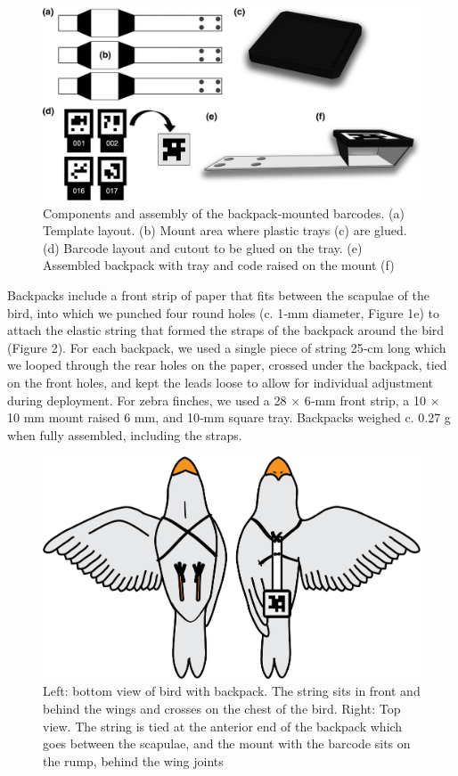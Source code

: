 \documentclass[11pt,a4paper,oneside]{article}
\begin{document}
\begin{figure}
    \centering
    \includegraphics{Graving_IMPRS_Thesis/figures/bird_figure_1.jpg}
    \caption{Components and assembly of the backpack‐mounted barcodes. (a) Template layout. (b) Mount area where plastic trays (c) are glued. (d) Barcode layout and cutout to be glued on the tray. (e) Assembled backpack with tray and code raised on the mount (f)}
    \label{fig:bird_figure_1}
\end{figure}


Backpacks include a front strip of paper that fits between the scapulae of the bird, into which we punched four round holes (c. 1‐mm diameter, Figure 1e) to attach the elastic string that formed the straps of the backpack around the bird (Figure 2). For each backpack, we used a single piece of string 25‐cm long which we looped through the rear holes on the paper, crossed under the backpack, tied on the front holes, and kept the leads loose to allow for individual adjustment during deployment. For zebra finches, we used a 28 × 6‐mm front strip, a 10 × 10 mm mount raised 6 mm, and 10‐mm square tray. Backpacks weighed c. 0.27 g when fully assembled, including the straps.

\begin{figure}
    \centering
    \includegraphics{Graving_IMPRS_Thesis/figures/bird_figure_2.jpg}
    \caption{Left: bottom view of bird with backpack. The string sits in front and behind the wings and crosses on the chest of the bird. Right: Top view. The string is tied at the anterior end of the backpack which goes between the scapulae, and the mount with the barcode sits on the rump, behind the wing joints}
    \label{fig:bird_figure_2}
\end{figure}
\end{document}
